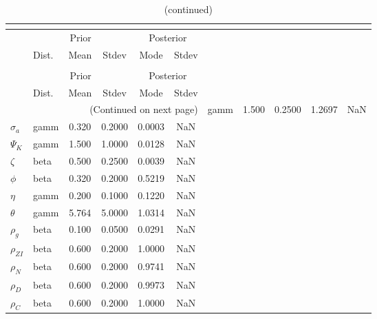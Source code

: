  
\begin{center}
\begin{longtable}{llcccc} 
\caption{Results from posterior maximization (parameters)}\\
 \label{Table:Posterior:1}\\
\toprule 
  & \multicolumn{3}{c}{Prior}  &  \multicolumn{2}{c}{Posterior} \\
  \cmidrule(r{.75em}){2-4} \cmidrule(r{.75em}){5-6}
  & Dist. & Mean  & Stdev & Mode & Stdev \\ 
\midrule \endfirsthead 
\caption{(continued)}\\
 \bottomrule 
  & \multicolumn{3}{c}{Prior}  &  \multicolumn{2}{c}{Posterior} \\
  \cmidrule(r{.75em}){2-4} \cmidrule(r{.75em}){5-6}
  & Dist. & Mean  & Stdev & Mode & Stdev \\ 
\midrule \endhead 
\bottomrule \multicolumn{6}{r}{(Continued on next page)}\endfoot 
\bottomrule\endlastfoot 
${\gamma}$ & gamm &   1.500 & 0.2500 &   1.2697 &     NaN \\ 
${\sigma_a}$ & gamm &   0.320 & 0.2000 &   0.0003 &     NaN \\ 
${\Psi_K}$ & gamm &   1.500 & 1.0000 &   0.0128 &     NaN \\ 
${\zeta}$ & beta &   0.500 & 0.2500 &   0.0039 &     NaN \\ 
${\phi}$ & beta &   0.320 & 0.2000 &   0.5219 &     NaN \\ 
${\eta}$ & gamm &   0.200 & 0.1000 &   0.1220 &     NaN \\ 
${\theta}$ & gamm &   5.764 & 5.0000 &   1.0314 &     NaN \\ 
${\rho_g}$ & beta &   0.100 & 0.0500 &   0.0291 &     NaN \\ 
${\rho_{ZI}}$ & beta &   0.600 & 0.2000 &   1.0000 &     NaN \\ 
${\rho_N}$ & beta &   0.600 & 0.2000 &   0.9741 &     NaN \\ 
${\rho_D}$ & beta &   0.600 & 0.2000 &   0.9973 &     NaN \\ 
${\rho_C}$ & beta &   0.600 & 0.2000 &   1.0000 &     NaN \\ 
\end{longtable}
 \end{center}
